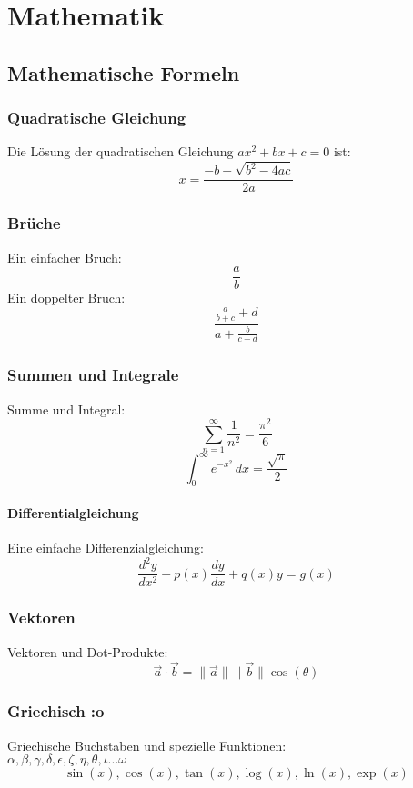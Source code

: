 

\chapter{Mathematik}
\label{chap:mathematik}


\section{Mathematische Formeln}
\subsection{Quadratische Gleichung}
Die Lösung der quadratischen Gleichung \(ax^2 + bx + c = 0\) ist:
\[
x = \frac{-b \pm \sqrt{b^2 - 4ac}}{2a}
\]
\subsection{Brüche}
Ein einfacher Bruch:
\[
\frac{a}{b}
\]
Ein doppelter Bruch:\\
\[
\frac{\frac{a}{b+c}+d}{a+\frac{b}{c+d}}
\]

\subsection{Summen und Integrale}
Summe und Integral:
\[
\sum_{n=1}^{\infty} \frac{1}{n^2} = \frac{\pi^2}{6}
\]
\[
\int_0^{\infty} e^{-x^2} \, dx = \frac{\sqrt{\pi}}{2}
\]


\subsubsection{Differentialgleichung}
Eine einfache Differenzialgleichung:
\[
\frac{d^2y}{dx^2} + p(x)\frac{dy}{dx} + q(x)y = g(x)
\]

\subsection{Vektoren}
Vektoren und Dot-Produkte:
\[
\vec{a} \cdot \vec{b} = \| \vec{a} \| \| \vec{b} \| \cos(\theta)
\]
\subsection{Griechisch :o}
Griechische Buchstaben und spezielle Funktionen:\\
$
\alpha, \beta, \gamma, \delta, \epsilon, \zeta, \eta, \theta, \iota ... \omega
$
\[
\sin(x), \cos(x), \tan(x), \log(x), \ln(x), \exp(x)
\]